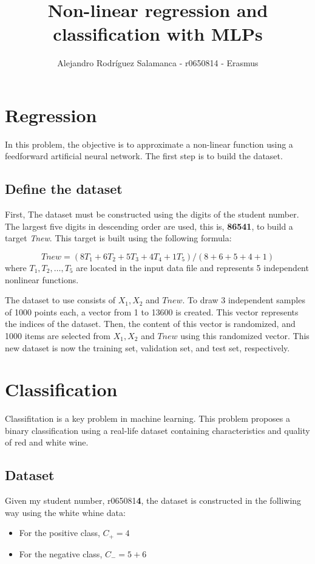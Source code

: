 \documentclass[10pt]{article}
\author{Alejandro Rodríguez Salamanca - r0650814 - Erasmus}
\date{}
\title{Non-linear regression and classification with MLPs}
\begin{document}
\maketitle

\begin{multicols}{2}

  \section*{Regression}
  In this problem, the objective is to approximate a non-linear function using
  a feedforward artificial neural network. The first step is to build the dataset.
  \subsection*{Define the dataset}
  First, 
  The dataset must be constructed using the digits of the student number. The
  largest five digits in descending order are used, this is, \textbf{86541}, to
  build a target \textit{Tnew}. This target is built using the following formula:

  $$Tnew = (8T_1 + 6T_2 + 5T_3 + 4T_4 + 1T_5) / (8 + 6 + 5 + 4 + 1)$$
  where $T_1, T_2, \ldots, T_5$ are located in the input data file and represents
  5 independent nonlinear functions.

  The dataset to use consists of $X_1, X_2$ and $Tnew$. To draw 3 independent samples
  of 1000 points each, a vector from 1 to 13600 is created. This vector represents
  the indices of the dataset. Then, the content of this vector is randomized, and
  1000 items are selected from $X_1, X_2$ and $Tnew$ using this randomized vector.
  This new dataset is now the training set, validation set, and test set, respectively.

  \section*{Classification}
  Classifitation is a key problem in machine learning. This problem proposes a binary
  classification using a  real-life dataset containing characteristics
  and quality of red and white wine.

  \subsection*{Dataset}
  Given my student number, r065081\textbf{4}, the dataset is constructed in the folliwing way
  using the white whine data:
  \begin{itemize}
    \item For the positive class, $C_{+} = 4$
    \item For the negative class, $C_{-} = 5+6$
    \end{itemize}


\end{multicols}
\end{document}
